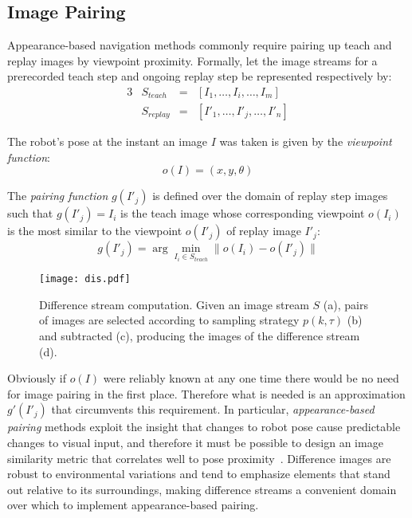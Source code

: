 \documentclass[twocolumn, 9pt,fleqn]{jsproceedings}
\begin{document}
\subsection{Image Pairing}

Appearance-based navigation methods commonly require pairing up teach and replay images by viewpoint proximity. Formally, let the image streams for a prerecorded teach step and ongoing replay step be represented respectively by:
\begin{alignat}{3}
& S_{teach} & = & [I_1, \dotsc, I_i, \dotsc, I_m] \\
& S_{replay} & = & [I'_1, \dotsc, I'_j, \dotsc, I'_n]
\end{alignat}

The robot's pose at the instant an image $I$ was taken is given by the \textit{viewpoint function}:
\begin{equation}
o(I) = (x, y, \theta)
\end{equation}

The \textit{pairing function} $g(I'_j)$ is defined over the domain of replay step images such that  $g(I'_j) = I_i$ is the teach image whose corresponding viewpoint $o(I_i)$ is the most similar to the viewpoint $o(I'_j)$ of replay image $I'_j$:
\begin{equation}
g(I'_j) = \arg \min_{I_i \in S_{teach}} {\|o(I_i) - o(I'_j)\|}
\end{equation}

\begin{figure}[t]
\texttt{[image: dis.pdf]}
\caption{Difference stream computation. Given an image stream $S$ (a), pairs of images are selected according to sampling strategy $p(k, \tau)$ (b) and subtracted (c), producing the images of the difference stream (d).}
\label{fig:dis}
\end{figure}

Obviously if $o(I)$ were reliably known at any one time there would be no need for image pairing in the first place. Therefore what is needed is an approximation $g'(I'_j)$ that circumvents this requirement. In particular, \textit{appearance-based pairing} methods exploit the insight that changes to robot pose cause predictable changes to visual input, and therefore it must be possible to design an image similarity metric that correlates well to pose proximity~\cite{HEL13b}. Difference images are robust to environmental variations and tend to emphasize elements that stand out relative to its surroundings, making difference streams a convenient domain over which to implement appearance-based pairing.
\end{document}
